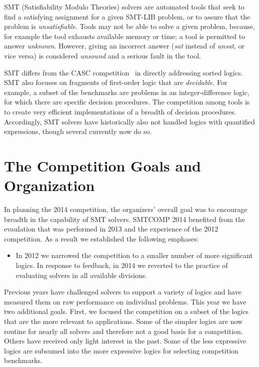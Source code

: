 \documentclass[twosize,11pt]{article}
\begin{document}
SMT (Satisfiability Modulo Theories) solvers are automated tools that seek to find a satisfying assignment for a given SMT-LIB problem, or to assure that the problem is \textit{unsatisfiable}.
Tools may not be able to solve a given problem, because, for example the tool exhausts available memory or time; a tool is permitted to answer \textit{unknown}. However, giving an incorrect answer (\textit{sat} instead of \textit{unsat}, or vice versa) is considered \textit{unsound} and a serious fault in the tool.

SMT differs from the CASC competition~\cite{PSS02} in directly addressing sorted logics. SMT also focuses on fragments of first-order logic that are \textit{decidable}. For example, a subset of the benchmarks are problems in an integer-difference logic, for which there are specific decision procedures. The competition among tools is to create very efficient implementations of a breadth of decision procedures. Accordingly, SMT solvers have historically also not handled logics with quantified expressions, though several currently now do so.

\section{The Competition Goals and Organization}
\label{sec:goals}

In planning the 2014 competition, the organizers' overall goal was to encourage breadth
in the capability of SMT solvers. SMTCOMP 2014 benefited from the evaulation that was performed in 2013 and the experience of the 2012 competition. As a result we established the following emphases:
\begin{itemize}
\item In 2012 we narrowed the competition to a smaller number of more significant logics. In response to feedback, in 2014 we reverted to the practice of evaluating solvers in all available divisions.


\end{itemize}

Previous years have challenged solvers to support a variety of logics and
have measured them on raw performance on individual problems. This year we have two additional goals. First, we
focused the competition on a subset of the logics that are the more relevant to applications. Some of the 
simpler logics are now routine for nearly all solvers and therefore not a good basis for a competition. Others have 
received only light interest in the past. Some of the less expressive logics are subsumed into the more expressive logics
for selecting competition benchmarks.
\end{document}
